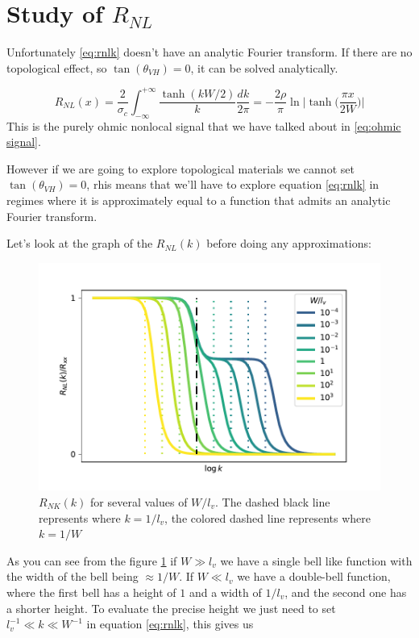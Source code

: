 \section{Study of $R_{NL}$}
Unfortunately \ref{eq:rnlk} doesn't have an analytic Fourier transform. If there are no topological effect, so $\tan (\theta_{VH})=0$, it can be solved analytically.

\begin{equation}
    R_{NL}(x)=\frac 2{\sigma_c}\int_{-\infty}^{+\infty}
    \frac{\tanh (kW/2)}k \frac {dk}{2\pi}=
    -\frac{2\rho}\pi\ln\bigg |\tanh \Big(\frac{\pi x}{2W}\Big)\bigg |
    \label{eq:ohmic signal2}
\end{equation}
This is the purely ohmic nonlocal signal that we have talked about in \ref{eq:ohmic signal}.

However if we are going to explore topological materials we cannot set $\tan (\theta_{VH})=0$, rhis means that we'll have to explore equation \ref{eq:rnlk} in regimes where it is approximately equal to a function that admits an analytic Fourier transform.

Let's look at the graph of the $R_{NL}(k)$ before doing any approximations:
\begin{figure}[h!]
    \centering
    \includegraphics[width=\linewidth]{Immagini/rnl/widths.pdf}
    \caption{$R_{NK}(k)$ for several values of $W/l_v$. The dashed black line represents where $k=1/l_v$, the colored dashed line represents where $k=1/W$}
    \label{fig:RNLk}
\end{figure}
As you can see from the figure \ref{fig:RNLk} if $W\gg l_v$ we have a single bell like function with the width of the bell being $\approx 1/W$. If $W\ll l_v$ we have a double-bell function, where the first bell has a height of $1$ and a width of $1/l_v$, and the second one has a shorter height. To evaluate the precise height we just need to set $l_v^{-1}\ll k \ll W^{-1}$ in equation \ref{eq:rnlk}, this gives us 



